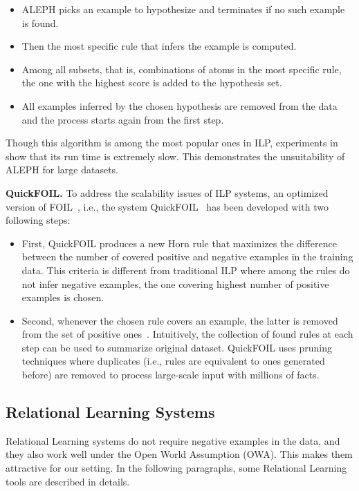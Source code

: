 \begin{itemize}
\item ALEPH picks an example to hypothesize and terminates if no such example is found.
\item Then the most specific rule that infers the example is computed.
\item Among all subsets, that is, combinations of atoms in the most specific rule, the one with the highest score is added to the hypothesis set.
\item All examples inferred by the chosen hypothesis are removed from the data and the process starts again from the first step.
\end{itemize}

Though this algorithm is among the most popular ones in ILP, experiments in~\cite{ref10} show that its run time is extremely slow. This demonstrates the unsuitability of ALEPH for large datasets.

\textbf{QuickFOIL.} To address the scalability issues of ILP systems, an optimized version of FOIL~\cite{ref36}, i.e., the system QuickFOIL~\cite{ref45} has been developed with two following steps:

\begin{itemize}
\item First, QuickFOIL produces a new Horn rule that maximizes the difference between the number of covered positive and negative examples in the training data. This criteria is different from traditional ILP where among the rules do not infer negative examples, the one covering highest number of positive examples is chosen.
\item Second, whenever the chosen rule covers an example, the latter is removed from the set of positive ones~\cite{ref10}. Intuitively, the collection of found rules at each step can be used to summarize original dataset. QuickFOIL uses pruning techniques where duplicates (i.e., rules are equivalent to ones generated before) are removed to process large-scale input with millions of facts.

\end{itemize}

\subsection{Relational Learning Systems}

Relational Learning systems do not require negative examples in the data, and they also work well under the Open World Assumption (OWA). This makes them attractive for our setting. In the following paragraphs, some Relational Learning tools are described in details.

